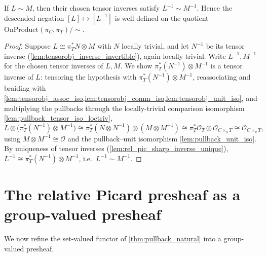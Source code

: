 \begin{lemma}
  \label{lem:relpic_rel_neg}
  If \(L \sim M\), then their chosen tensor inverses satisfy \(L^{-1} \sim
  M^{-1}\). Hence the descended negation \([L] \mapsto [L^{-1}]\) is well defined
  on the quotient \(\mathrm{OnProduct}(\pi_C, \pi_T) / {\sim}\).
\end{lemma}

\begin{proof}
  \leanok
  Suppose \(L \cong \pi_T^* N \otimes M\) with \(N\) locally trivial, and let
  \(N^{-1}\) be its tensor inverse (\cref{lem:tensorobj_inverse_invertible}),
  again locally trivial. Write \(L^{-1}, M^{-1}\) for the chosen tensor inverses
  of \(L, M\). We show \(\pi_T^*(N^{-1}) \otimes M^{-1}\) is a tensor inverse of
  \(L\): tensoring the hypothesis with \(\pi_T^*(N^{-1}) \otimes M^{-1}\),
  reassociating and braiding with
  \cref{lem:tensorobj_assoc_iso,lem:tensorobj_comm_iso,lem:tensorobj_unit_iso},
  and multiplying the pullbacks through the locally-trivial comparison
  isomorphism \cref{lem:pullback_tensor_iso_loctriv},
  \[
    L \otimes \bigl(\pi_T^*(N^{-1}) \otimes M^{-1}\bigr)
      \cong \pi_T^*(N \otimes N^{-1}) \otimes (M \otimes M^{-1})
      \cong \pi_T^* \mathcal{O}_T \otimes \mathcal{O}_{C \times_k T}
      \cong \mathcal{O}_{C \times_k T} ,
  \]
  using \(M \otimes M^{-1} \cong \mathcal{O}\) and the pullback--unit
  isomorphism \cref{lem:pullback_unit_iso}. By uniqueness of tensor inverses
  (\cref{lem:rel_pic_sharp_inverse_unique}),
  \(L^{-1} \cong \pi_T^*(N^{-1}) \otimes M^{-1}\), i.e.\ \(L^{-1} \sim M^{-1}\).
\end{proof}

\section{The relative Picard presheaf as a group-valued presheaf}
\label{sec:relpic_groupvalued}

We now refine the set-valued functor of \cref{thm:pullback_natural} into a
group-valued presheaf.

